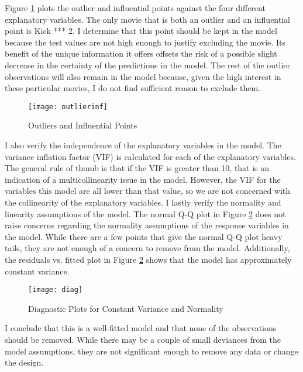 \documentclass{svproc}
\begin{document}
Figure \ref{outlierinf} plots the outlier and influential points against the four different explanatory variables.  The only movie that is both an outlier and an influential point is Kick *** 2. I determine that this point should be kept in the model because the test values are not high enough to justify excluding the movie. Its benefit of the unique information it offers offsets the risk of a possible slight decrease in the certainty of the predictions in the model. The rest of the outlier observations will also remain in the model because, given the high interest in these particular movies, I do not find sufficient reason to exclude them.

\begin{figure}
\begin{center}
\caption{Outliers and Influential Points}
\texttt{[image: outlierinf]}
\label{outlierinf}
\smallskip
\end{center}
\end{figure}

I also verify the independence of the explanatory variables in the model. The variance inflation factor (VIF) is calculated for each of the explanatory variables. The general rule of thumb is that if the VIF is greater than 10, that is an indication of a multicollinearity issue in the model. However, the VIF for the variables this model are all lower than that value, so we are not concerned with the collinearity of the explanatory variables. I lastly verify the normality and linearity assumptions of the model. The normal Q-Q plot in Figure \ref{diag} does not raise concerns regarding the normality assumptions of the response variables in the model. While there are a few points that give the normal Q-Q plot heavy tails, they are not enough of a concern to remove from the model. Additionally, the residuals vs. fitted plot in Figure \ref{diag} shows that the model has approximately constant variance. 

\begin{figure}
\begin{center}
\caption{Diagnostic Plots for Constant Variance and Normality}
\smallskip
\texttt{[image: diag]}
\label{diag}
\end{center}
\end{figure}

I conclude that this is a well-fitted model and that none of the observations should be removed. While there may be a couple of small deviances from the model assumptions, they are not significant enough to remove any data or change the design.
\end{document}
